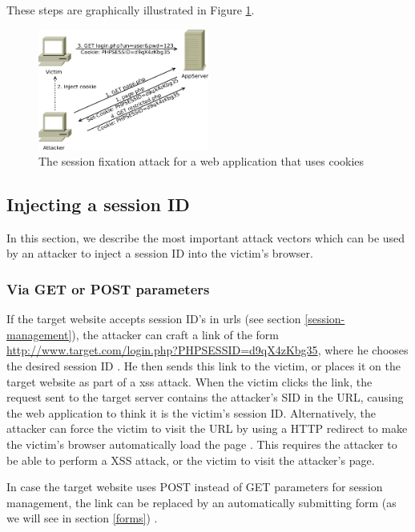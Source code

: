 These steps are graphically illustrated in Figure \ref{fig:fixation}.

\begin{figure}[htb]
	\centering
	\includegraphics[width=0.50\textwidth]{img/fixation.png}
	\caption[The session fixation attack]{The session fixation attack for a web application that uses cookies}
	\label{fig:fixation}
\end{figure}

\subsection{Injecting a session ID}\label{injecting-sid}

In this section, we describe the most important attack vectors which can be used by an attacker to inject a session ID into the victim's browser.

\subsubsection{Via GET or POST parameters}\label{get-or-post}

If the target website accepts session ID's in \glspl{url} (see section \ref{session-management}), the attacker can craft a link of the form \url{http://www.target.com/login.php?PHPSESSID=d9qX4zKbg35}, where he chooses the desired session ID \cite{Johns2011}. He then sends this link to the victim, or places it on the target website as part of a \gls{xss} attack. When the victim clicks the link, the request sent to the target server contains the attacker's SID in the URL, causing the web application to think it is the victim's session ID. Alternatively, the attacker can force the victim to visit the URL by using a HTTP redirect \cite{rfc2616} to make the victim's browser automatically load the page \cite{Shiflett2004}. This requires the attacker to be able to perform a XSS attack, or the victim to visit the attacker's page.

In case the target website uses POST instead of GET parameters for session management, the link can be replaced by an automatically submitting form (as we will see in section \ref{forms}) \cite{Kolsek2002,Bontrager2005}.

